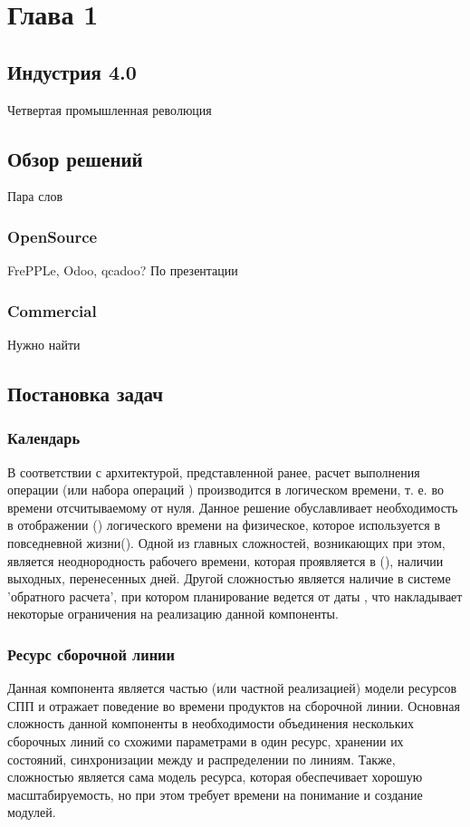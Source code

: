 \chapter{Глава 1}
\section{Индустрия 4.0}
Четвертая промышленная революция


\section{Обзор решений}
Пара слов
\subsection{OpenSource}
FrePPLe, Odoo, qcadoo?
По презентации
\subsection{Commercial}
Нужно найти
\section{Постановка задач}
\subsection{Календарь}
В соответствии с архитектурой, представленной ранее, расчет выполнения операции (или набора операций ) производится в логическом времени, т. е. во времени отсчитываемому от нуля. Данное решение обуславливает необходимость в отображении () логического времени на физическое, которое используется в повседневной жизни(). Одной из главных сложностей, возникающих при этом, является неоднородность рабочего времени, которая проявляется в (), наличии выходных, перенесенных дней. Другой сложностью является наличие в системе 'обратного расчета', при котором планирование ведется от даты , что накладывает некоторые ограничения на реализацию данной компоненты.
\subsection{Ресурс сборочной линии}
Данная компонента является частью (или частной реализацией) модели ресурсов СПП и отражает поведение во времени продуктов на сборочной линии. Основная сложность данной компоненты в необходимости объединения нескольких сборочных линий со схожими параметрами в один ресурс, хранении их состояний, синхронизации между  и распределении  по линиям. Также, сложностью является сама модель ресурса, которая обеспечивает хорошую масштабируемость, но при этом требует времени на понимание и создание модулей.
